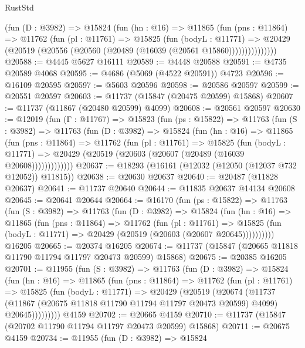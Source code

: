 \begin{lexlean}{RustStd}
\begin{coremodule}
            (fun (D : @3982) =>
            @15824
              (fun (hn : @16) =>
              @11865
                (fun (pns : @11864) =>
                @11762
                  (fun (pl : @11761) =>
                  @15825
                    (fun (bodyL : @11771) =>
                    @20429 (@20519 (@20556 (@20560 (@20489 (@16039 (@20561 @15860)))))))))))))))
@20588 := @4445 @5627 @16111
@20589 := @4448 @20588
@20591 := @4735 @20589 @4068
@20595 := @4686 (@5069 (@4522 @20591)) @4723
@20596 := @16109 @20595
@20597 := @5603 @20596
@20598 := @20586 @20597
@20599 := @20551 @20597
@20603 := @11737 (@15847 (@20475 @20599) @15868)
@20607 := @11737 (@11867 (@20480 @20599) @4099)
@20608 := @20561 @20597
@20630 := @12019
    (fun (Γ : @11767) =>
    @15823
      (fun (ps : @15822) =>
      @11763
        (fun (S : @3982) =>
        @11763
          (fun (D : @3982) =>
          @15824
            (fun (hn : @16) =>
            @11865
              (fun (pns : @11864) =>
              @11762
                (fun (pl : @11761) =>
                @15825
                  (fun (bodyL : @11771) =>
                  @20429 (@20519 (@20603 (@20607 (@20489 (@16039 @20608)))))))))))))
@20637 := @18293 (@16161 (@12032 (@12050 (@12037 @732 @12052)) @11815))
@20638 := @20630 @20637
@20640 := @20487 (@11828 @20637)
@20641 := @11737 @20640
@20644 := @11835 @20637 @14134 @20608
@20645 := @20641 @20644
@20664 := @16170
    (fun (ps : @15822) =>
    @11763
      (fun (S : @3982) =>
      @11763
        (fun (D : @3982) =>
        @15824
          (fun (hn : @16) =>
          @11865
            (fun (pns : @11864) =>
            @11762
              (fun (pl : @11761) =>
              @15825 (fun (bodyL : @11771) => @20429 (@20519 (@20603 (@20607 @20645))))))))))
    @16205
@20665 := @20374 @16205
@20674 := @11737 (@15847 (@20665 @11818 @11790 @11794 @11797 @20473 @20599) @15868)
@20675 := @20385 @16205
@20701 := @11955
    (fun (S : @3982) =>
    @11763
      (fun (D : @3982) =>
      @15824
        (fun (hn : @16) =>
        @11865
          (fun (pns : @11864) =>
          @11762
            (fun (pl : @11761) =>
            @15825
              (fun (bodyL : @11771) =>
              @20429
                (@20519
                  (@20674
                    (@11737
                      (@11867 (@20675 @11818 @11790 @11794 @11797 @20473 @20599) @4099)
                      @20645)))))))))
    @4159
@20702 := @20665 @4159
@20710 := @11737 (@15847 (@20702 @11790 @11794 @11797 @20473 @20599) @15868)
@20711 := @20675 @4159
@20734 := @11955
    (fun (D : @3982) =>
    @15824

\end{coremodule}
\end{lexlean}

